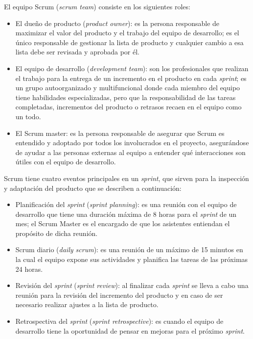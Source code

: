 El equipo Scrum (\textit{scrum team}) consiste en los siguientes roles:
\begin{itemize}
	\item El dueño de producto (\textit{product owner}): es la persona responsable de maximizar el valor del producto y el trabajo del equipo de desarrollo; es el único responsable de gestionar la lista de producto y cualquier cambio a esa lista debe ser revisada y aprobada por él.
	\item El equipo de desarrollo (\textit{development team}): son los profesionales que realizan el trabajo para la entrega de un incremento en el producto en cada \textit{sprint}; es un grupo autoorganizado y multifuncional donde cada miembro del equipo tiene habilidades especializadas, pero que la responsabilidad de las tareas completadas, incrementos del producto o retrasos recaen en el equipo como un todo.
	\item  El Scrum master: es la persona responsable de asegurar que Scrum es entendido y adoptado por todos los involucrados en el proyecto, asegurándose de ayudar a las personas externas al equipo a entender qué interacciones son útiles con el equipo de desarrollo.
\end{itemize}


Scrum tiene cuatro eventos principales en  un \textit{sprint}, que sirven para la inspección y adaptación del producto que se describen a continuación:
\begin{itemize}
	\item Planificación del \textit{sprint} (\textit{sprint planning}): es una reunión con el equipo de desarrollo que tiene una duración máxima de 8 horas para el \textit{sprint} de un mes; el Scrum Master es el encargado de que los asistentes entiendan el propósito de dicha reunión.
	\item Scrum diario (\textit{daily scrum}): es una reunión de un máximo de 15 minutos en la cual el equipo expone sus actividades y planifica las tareas de las próximas 24 horas.
	\item Revisión del \textit{sprint} (\textit{sprint review}): al finalizar cada \textit{sprint} se lleva a cabo una reunión para la revisión del incremento del producto y en caso de ser necesario realizar ajustes a la lista de producto.
	\item Retrospectiva del \textit{sprint} (\textit{sprint retrospective}): es cuando el equipo de desarrollo tiene la oportunidad de pensar en mejoras para el próximo \textit{sprint}.
\end{itemize}

